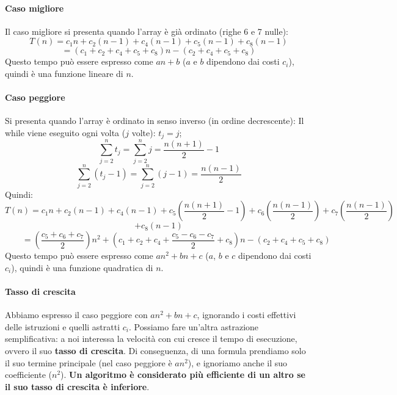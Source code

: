 \documentclass[11pt,a4paper]{article}
\begin{document}
\paragraph{Caso migliore}
Il caso migliore si presenta quando l’array è già ordinato (righe 6 e 7 nulle):
\[T(n)=c_1n+c_2(n-1)+c_4(n-1)+c_5(n-1)+c_8(n-1)\]
\[=(c_1+c_2+c_4+c_5+c_8)n-(c_2+c_4+c_5+c_8)\]
Questo tempo può essere espresso come $an+b$ ($a$ e $b$ dipendono dai costi $c_i$), quindi è una funzione lineare di $n$.

\paragraph{Caso peggiore} Si presenta quando l’array è ordinato in senso inverso (in ordine decrescente):
Il while viene eseguito ogni volta ($j$ volte): $t_j=j$;
\[\sum_{j=2}^{n}t_j=\sum_{j=2}^{n}j=\frac{n(n+1)}{2}-1\]
\[\sum_{j=2}^{n}(t_j-1)=\sum_{j=2}^{n}(j-1)=\frac{n(n-1)}{2}\]
Quindi:
\[T(n)=c_1n+c_2(n-1)+c_4(n-1)+c_5(\frac{n(n+1)}{2}-1)+c_6(\frac{n(n-1)}{2})+c_7(\frac{n(n-1)}{2})\]
\[+c_8(n-1)\]
\[\ \ \ \ \ \ \ \ \ =(\frac{c_5+c_6+c_7}{2})n^2+(c_1+c_2+c_4+\frac{c_5-c_6-c_7}{2}+c_8)n-(c_2+c_4+c_5+c_8)\]
Questo tempo può essere espresso come $an^2+bn+c$ ($a$, $b$ e $c$ dipendono dai costi $c_i$), quindi è una funzione quadratica di $n$.

\paragraph{Tasso di crescita}
Abbiamo espresso il caso peggiore con $an^2+bn+c$, ignorando i costi effettivi delle istruzioni e quelli astratti $c_i$.
Possiamo fare un’altra astrazione semplificativa: a noi interessa la velocità con cui cresce il tempo di
esecuzione, ovvero il suo \textbf{tasso di crescita}. Di conseguenza, di una formula prendiamo solo il suo termine
principale (nel caso peggiore è $an^2$), e ignoriamo anche il suo coefficiente ($n^2$).
\textbf{Un algoritmo è considerato più efficiente di un altro se il suo tasso di crescita è inferiore}.
\end{document}
